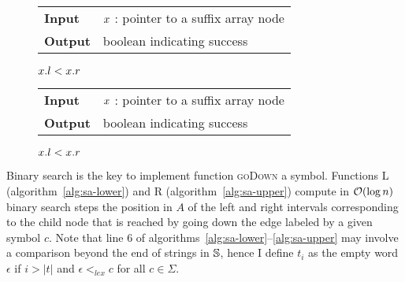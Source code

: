 \begin{figure*}[t!]
\begin{minipage}[t]{.5\textwidth}
\begin{algorithm}[H]
\begin{tabular}{ll}
\textbf{Input}  & $x$ : pointer to a suffix array node\\
\textbf{Output} & boolean indicating success\\
\end{tabular}
\begin{algorithmic}[1]
	\State \Return \False
\EndIf
{}
{}
\EndIf
\State \Return $x.l < x.r$
\end{algorithmic}
\label{alg:sa-godown}
\end{algorithm}
\end{minipage}
\hfill
\begin{minipage}[t]{.5\textwidth}
\begin{algorithm}[H]
\begin{tabular}{ll}
\textbf{Input}  & $x$ : pointer to a suffix array node\\
\textbf{Output} & boolean indicating success\\
\end{tabular}
\begin{algorithmic}[1]
	\State \Return \False
\EndIf
{}
\EndIf
\State \Return $x.l < x.r$
\item[]
\end{algorithmic}
\label{alg:sa-goright}
\end{algorithm}
\end{minipage}
\end{figure*}

Binary search is the key to implement function \textsc{goDown} a symbol.
Functions \textsc{L} (algorithm~\ref{alg:sa-lower}) and \textsc{R} (algorithm~\ref{alg:sa-upper}) compute in $\mathcal{O}(\log{n})$ binary search steps the position in $A$ of the left and right intervals corresponding to the child node that is reached by going down the edge labeled by a given symbol $c$.
Note that line 6 of algorithms~\ref{alg:sa-lower}--\ref{alg:sa-upper} may involve a comparison beyond the end of strings in $\mathbb {S}$, hence I define $t_i$ as the empty word $\epsilon$ if $i > |t|$ and $\epsilon <_{lex} c$ for all $c \in \Sigma$.

